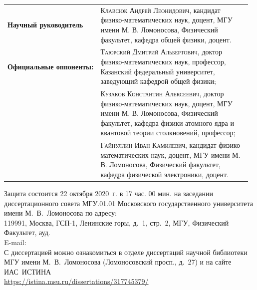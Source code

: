 \documentclass[10pt]{book}
\begin{document}
\small
\begin{tabular}{@{}p{0.37\linewidth} p{0.6\linewidth}@{}}
	\textbf{Научный руководитель} & 		\textsc{Клавсюк Андрей Леонидович}, \newline 
											кандидат физико-математических наук, доцент,
											МГУ имени М. В. Ломоносова, Физический факультет, кафедра общей физики, доцент. \\
	
	\textbf{Официальные оппоненты:} & 		\textsc{Таюрский Дмитрий Альбертович}, \newline
											доктор физико-математических наук, профессор,
											Казанский федеральный университет, заведующий кафедрой общей физики; \\
	
	&                           			\textsc{Кузаков Константин Алексеевич}, \newline 
											доктор физико-математических наук, доцент, 
											МГУ имени М. В. Ломоносова, Физический факультет, кафедра физики атомного ядра и квантовой теории столкновений, профессор; \\ 
	
	&                           			\textsc{Гайнуллин Иван Камилевич}, \newline 
											кандидат физико-математических наук, доцент, 
											МГУ имени М. В. Ломоносова, Физический факультет, кафедра физической электроники, доцент. \\ 
\end{tabular}
\normalsize 
\vspace*{0.5cm}

Защита состоится 22 октября 2020~г. в 17 час. 00 мин. 
на заседании диссертационного совета МГУ.01.01 Московского государственного университета имени М.~В.~Ломоносова по адресу: \\
119991, Москва, ГСП-1, Ленинские горы, д.~1, стр.~2, МГУ, Физический Факультет, ауд. \underline{\hspace*{1cm}} \\

E-mail:  \\


С диссертацией можно ознакомиться в отделе диссертаций научной библиотеки МГУ имени М.~В.~Ломоносова (Ломоносовский просп., д.~27) и на сайте ИАС~ИСТИНА \\
\url{https://istina.msu.ru/dissertations/317745379/}
\vspace*{0.5cm}
\end{document}
